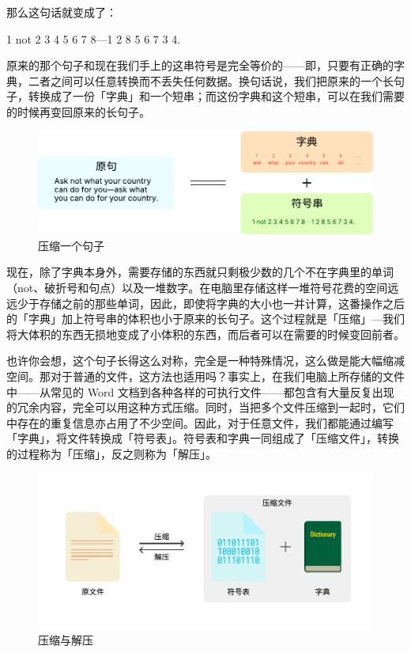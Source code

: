 那么这句话就变成了：

\begin{quoting}
  1 not 2 3 4 5 6 7 8—1 2 8 5 6 7 3 4.
\end{quoting}

原来的那个句子和现在我们手上的这串符号是完全等价的——即，只要有正确的字典，二者之间可以任意转换而不丢失任何数据。换句话说，我们把原来的一个长句子，转换成了一份「字典」和一个短串；而这份字典和这个短串，可以在我们需要的时候再变回原来的长句子。

\begin{figure}[htb!]
  \centering
  \includegraphics[width=.9\textwidth]{assets/software/Compress_a_sentence.pdf}
  \caption{压缩一个句子}
  \label{fig:Compress_a_sentence}
\end{figure}

现在，除了字典本身外，需要存储的东西就只剩极少数的几个不在字典里的单词（not、破折号和句点）以及一堆数字。在电脑里存储这样一堆符号花费的空间远远少于存储之前的那些单词，因此，即使将字典的大小也一并计算，这番操作之后的「字典」加上符号串的体积也小于原来的长句子。这个过程就是「压缩」—我们将大体积的东西无损地变成了小体积的东西，而后者可以在需要的时候变回前者。

也许你会想，这个句子长得这么对称，完全是一种特殊情况，这么做是能大幅缩减空间。那对于普通的文件，这方法也适用吗？事实上，在我们电脑上所存储的文件中——从常见的 Word 文档到各种各样的可执行文件——都包含有大量反复出现的冗余内容，完全可以用这种方式压缩。同时，当把多个文件压缩到一起时，它们中存在的重复信息亦占用了不少空间。因此，对于任意文件，我们都能通过编写「字典」，将文件转换成「符号表」。符号表和字典一同组成了「压缩文件」，转换的过程称为「压缩」，反之则称为「解压」。

\begin{figure}[htb!]
  \centering
  \includegraphics[width=.8\textwidth]{assets/software/Compress_and_Extract.pdf}
  \caption{压缩与解压}
  \label{fig:Compress_and_Extract}
\end{figure}

